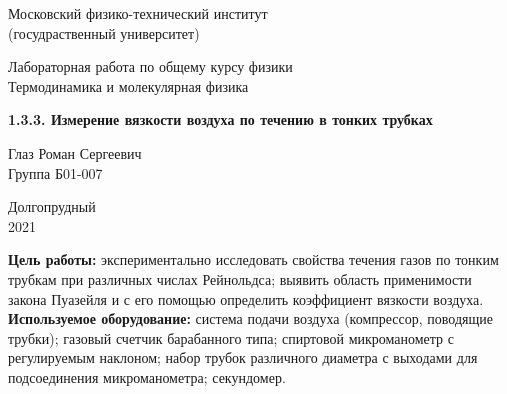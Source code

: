 \documentclass[a4paper, 12pt]{article} %
\begin{document}


\begin{titlepage}

	\newpage
	\begin{center}
		\normalsize Московский физико-технический институт \\(госудраственный университет)
	\end{center}

	\vspace{6em}

	\begin{center}
		\Large Лабораторная работа по общему курсу физики\\Термодинамика и молекулярная физика
	\end{center}

	\vspace{1em}

	\begin{center}
		\Large \textbf{1.3.3. Измерение вязкости воздуха по течению в тонких трубках }
	\end{center}

	\vspace{2em}

	\begin{center}
		\large Глаз Роман Сергеевич\\
		Группа Б01-007
	\end{center}

	\vspace{\fill}

	\begin{center}
	Долгопрудный \\2021
	\end{center}
	
\end{titlepage}



	\thispagestyle{empty}
	\newpage
	\tableofcontents
	\newpage
	\setcounter{page}{1}



\textbf{Цель работы:} экспериментально исследовать свойства течения газов по тонким трубкам при различных числах Рейнольдса; выявить область применимости закона Пуазейля и с его помощью определить коэффициент вязкости воздуха.\\

\textbf{Используемое оборудование:} система подачи воздуха (компрессор, поводящие трубки); газовый счетчик барабанного типа; спиртовой микроманометр с регулируемым наклоном; набор трубок различного диаметра с выходами для подсоединения микроманометра; секундомер.
\end{document}
